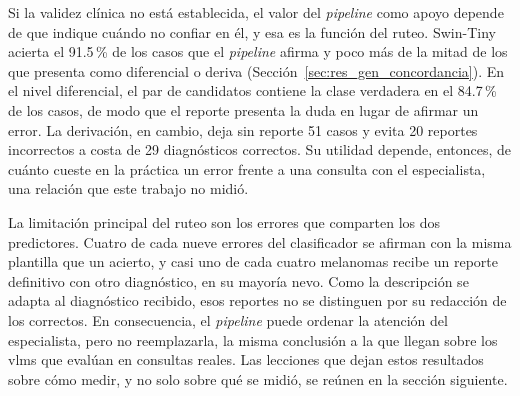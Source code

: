 Si la validez clínica no está establecida, el valor del \emph{pipeline} como apoyo depende de que indique cuándo no
confiar en él, y esa es la función del ruteo. Swin-Tiny acierta el 91.5\,\% de los casos que el \emph{pipeline} afirma
y poco más de la mitad de los que presenta como diferencial o deriva (Sección~\ref{sec:res_gen_concordancia}). En el
nivel diferencial, el par de candidatos contiene la clase verdadera en el 84.7\,\% de los casos, de modo que el
reporte presenta la duda en lugar de afirmar un error. La derivación, en cambio, deja sin reporte 51 casos y evita 20
reportes incorrectos a costa de 29 diagnósticos correctos. Su utilidad depende, entonces, de cuánto cueste en la
práctica un error frente a una consulta con el especialista, una relación que este trabajo no midió.

La limitación principal del ruteo son los errores que comparten los dos predictores. Cuatro de cada nueve errores del
clasificador se afirman con la misma plantilla que un acierto, y casi uno de cada cuatro melanomas recibe un reporte
definitivo con otro diagnóstico, en su mayoría nevo. Como la descripción se adapta al diagnóstico recibido, esos
reportes no se distinguen por su redacción de los correctos. En consecuencia, el \emph{pipeline} puede ordenar la
atención del especialista, pero no reemplazarla, la misma conclusión a la que llegan \textcite{jiang2026multimodal}
sobre los \glspl{vlm} que evalúan en consultas reales. Las lecciones que dejan estos resultados sobre cómo medir, y no
solo sobre qué se midió, se reúnen en la sección siguiente.
